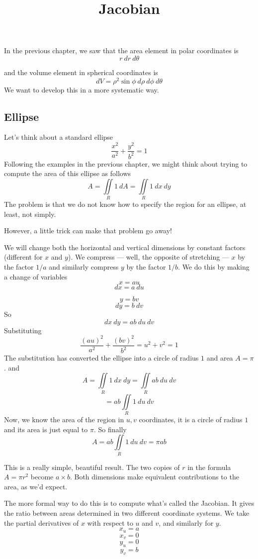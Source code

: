 \documentclass[11pt, oneside]{article}
\title{Jacobian}
\date{}
\begin{document}
\maketitle
\Large

In the previous chapter, we saw that the area element in polar coordinates is
\[ r \ dr \ d \theta \]

and the volume element in spherical coordinates is
\[ dV = \rho^2 \sin \phi  \ d \rho \ d \phi \ d \theta \]
We want to develop this in a more systematic way.

\subsection*{Ellipse}
Let's think about a standard ellipse
\[ \frac{x^2}{a^2} + \frac{y^2}{b^2} = 1 \]
Following the examples in the previous chapter, we might think about trying to compute the area of this ellipse as follows
\[ A = \iint\limits_{R} 1 \ dA = \iint\limits_{R} 1 \ dx \ dy \]
The problem is that we do not know how to specify the region for an ellipse, at least, not simply.  

However, a little trick can make that problem go away!

We will change both the horizontal and vertical dimensions by constant factors (different for $x$ and $y$).  We compress --- well, the opposite of stretching --- $x$ by the factor $1/a$ and similarly compress $y$ by the factor $1/b$.  We do this by making a change of variables
\[ x = au\] 
\[ dx = a\ du \]

\[ y = bv \]
\[ dy = b\ dv \]
So 
\[ dx \ dy = ab \ du \ dv \]
Substituting
\[ \frac{(au)^2}{a^2} + \frac{(bv)^2}{b^2} = u^2 + v^2 = 1\]
The substitution has converted the ellipse into a circle of radius $1$ and area $A = \pi$.
and
\[ A = \iint\limits_{R} 1 \ dx \ dy =  \iint\limits_{R} ab \ du \ dv \]
\[ = ab \iint\limits_{R} 1 \ du \ dv \]
Now, we know the area of the region in $u,v$ coordinates, it is a circle of radius $1$ and its area is just equal to $\pi$.  So finally
\[ A = ab \iint\limits_{R} 1 \ du \ dv = \pi a b \]

This is a really simple, beautiful result.  The two copies of $r$ in the formula $A= \pi r^2$ become $a \times b$.  Both dimensions make equivalent contributions to the area, as we'd expect.

The more formal way to do this is to compute what's called the Jacobian.  It gives the ratio between areas determined in two different coordinate systems.  We take the partial derivatives of $x$ with respect to $u$ and $v$, and similarly for $y$.
\[ x_u = a \]
\[ x_v = 0 \]
\[ y_u = 0 \]
\[ y_v = b \]
\end{document}
